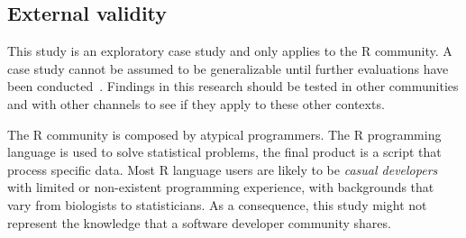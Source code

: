 \documentclass{sig-alternate-05-2015}
\begin{document}


\subsection{External validity}

	This study is an exploratory case study and only applies to the R community.
	A case study cannot be assumed to be generalizable until further evaluations have been conducted~\cite{Yin2009}.
	Findings in this research should be tested in other communities and with other channels to see if they apply to these other contexts.

    The R community is composed by atypical programmers.
    The R programming language is used to solve statistical problems, the final product is a script that process specific data.
    Most R language users are likely to be \textit{casual developers} with limited or non-existent programming experience, with backgrounds that vary from biologists to statisticians.
	As a consequence, this study might not represent the knowledge that a software developer community shares.

\end{document}
